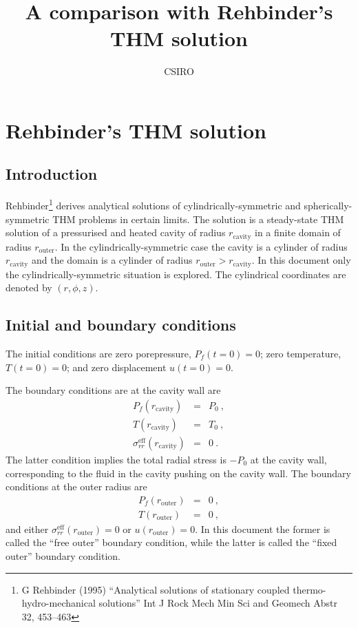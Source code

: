 \documentclass[]{scrreprt}
\begin{document}
\title{A comparison with Rehbinder's THM solution}
\author{CSIRO}
\maketitle

\tableofcontents

\chapter{Rehbinder's THM solution}

\section{Introduction}

Rehbinder\footnote{G Rehbinder (1995) ``Analytical solutions of
  stationary coupled thermo-hydro-mechanical solutions'' Int J Rock
  Mech Min Sci and Geomech Abstr 32, 453--463} derives analytical
solutions of cylindrically-symmetric and spherically-symmetric THM
problems in certain limits.  The solution is a steady-state THM solution
of a pressurised and
heated cavity of radius $r_{\mathrm{cavity}}$ in a finite domain of
radius $r_{\mathrm{outer}}$.  In the cylindrically-symmetric case the
cavity is a cylinder of radius $r_{\mathrm{cavity}}$ and the domain is
a cylinder of radius $r_{\mathrm{outer}}>r_{\mathrm{cavity}}$.  In
this document only the cylindrically-symmetric situation is explored.
The cylindrical coordinates are denoted by $(r, \phi, z)$.

\section{Initial and boundary conditions}

The initial conditions are zero porepressure, $P_{f}(t=0) = 0$;
zero temperature, $T(t=0) = 0$; and zero displacement $u(t=0)=0$.

The boundary conditions are at the cavity wall are
\begin{eqnarray}
P_{f}(r_{\mathrm{cavity}}) & = & P_{0} \ , \nonumber \\
T(r_{\mathrm{cavity}}) & = & T_{0} \ , \nonumber \\
\sigma_{rr}^{\mathrm{eff}}(r_{\mathrm{cavity}}) & = & 0 \ .
\end{eqnarray}
The latter condition implies the total radial stress is $-P_{0}$ at the
cavity wall, corresponding to the fluid in the cavity pushing on the
cavity wall.  The boundary conditions at the outer radius are
\begin{eqnarray}
P_{f}(r_{\mathrm{outer}}) & = & 0 \ , \nonumber \\
T(r_{\mathrm{outer}}) & = & 0 \ ,
\end{eqnarray}
and either $\sigma_{rr}^{\mathrm{eff}}(r_{\mathrm{outer}}) = 0$ or $u(r_{\mathrm{outer}})
= 0$.  In this document the former is called the ``free outer''
boundary condition, while the latter is called the ``fixed outer''
boundary condition.
\end{document}
